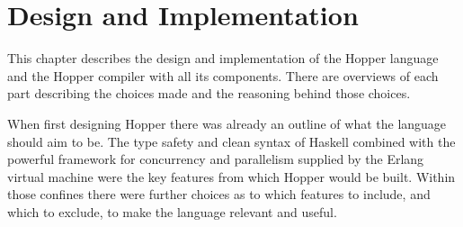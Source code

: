 \chapter{Design and Implementation}

This chapter describes the design and implementation of the Hopper language and the Hopper compiler with all its components. There are overviews of each part describing the choices made and the reasoning behind those choices.

When first designing Hopper there was already an outline of what the language should aim to be. The type safety and clean syntax of Haskell combined with the powerful framework for concurrency and parallelism supplied by the Erlang virtual machine were the key features from which Hopper would be built. Within those confines there were further choices as to which features to include, and which to exclude, to make the language relevant and useful.






